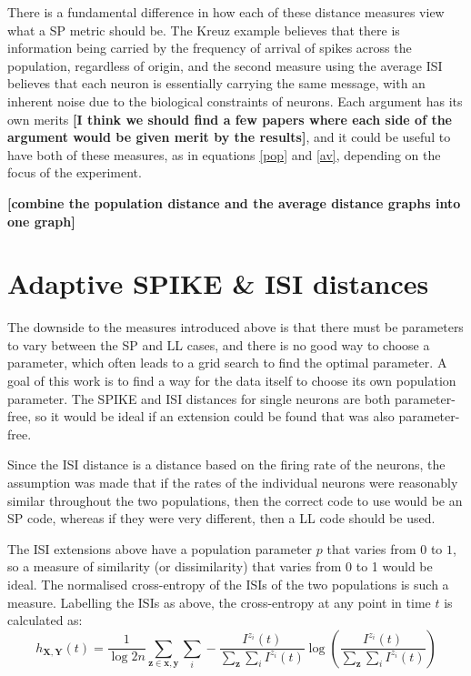 There is a fundamental difference in how each of these distance measures view what a SP metric should be.  The Kreuz example believes that there is information being carried by the frequency of arrival of spikes across the population, regardless of origin, and the second measure using the average ISI believes that each neuron is essentially carrying the same message, with an inherent noise due to the biological constraints of neurons.  Each argument has its own merits {\bf[I think we should find a few papers where each side of the argument would be given merit by the results]}, and it could be useful to have both of these measures, as in equations \ref{pop} and \ref{av}, depending on the focus of the experiment.

{\bf [combine the population distance and the average distance graphs into one graph]}

\newpage
\section{Adaptive SPIKE \& ISI distances}

The downside to the measures introduced above is that there must be parameters to vary between the SP and LL cases, and there is no good way to choose a parameter, which often leads to a grid search to find the optimal parameter.  A goal of this work is to find a way for the data itself to choose its own population parameter.  The SPIKE and ISI distances for single neurons are both parameter-free, so it would be ideal if an extension could be found that was also parameter-free.

Since the ISI distance is a distance based on the firing rate of the neurons, the assumption was made that if the rates of the individual neurons were reasonably similar throughout the two populations, then the correct code to use would be an SP code, whereas if they were very different, then a LL code should be used.

The ISI extensions above have a population parameter $p$ that varies from $0$ to $1$, so a measure of similarity (or dissimilarity) that varies from 0 to 1 would be ideal.  The normalised cross-entropy of the ISIs of the two populations is such a measure.  Labelling the ISIs as above, the cross-entropy at any point in time $t$ is calculated as:
\begin{equation}
h_{\mathbf{X}, \mathbf{Y}}(t) = \frac{1}{\log 2n}\sum_{\mathbf{z}\in\mathbf{x,y}}\sum_i -\frac{I^{z_i}(t)}{\sum_{\mathbf{z}}\sum_i I^{z_i}(t)} \log\left(\frac{I^{z_i}(t)}{\sum_{\mathbf{z}}\sum_i I^{z_i}(t)}\right)
\end{equation}

